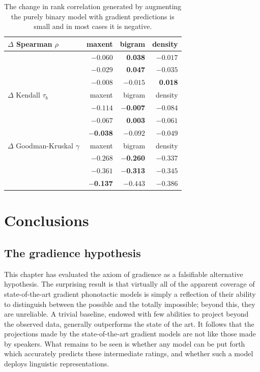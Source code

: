 \begin{table} \centering
\begin{tabular}{l r r r}
\toprule
$\Delta$ Spearman $\rho$          & maxent            & bigram            & density  \\
\midrule
\citealt{Greenberg1964}  & $-0.060$          &  \textbf{0.038} & $-0.017$ \\
\citealt{Scholes1966}    & $-0.029$          &  \textbf{0.047} & $-0.035$ \\
\citealt{Albright2003b}  & $-0.008$          & $-0.015$          & \textbf{0.018} \\
\midrule
$\Delta$ Kendall $\tau_b$         & maxent            & bigram            & density  \\
\midrule
\citealt{Greenberg1964}  & $-0.114$          & \textbf{$-$0.007} & $-0.084$ \\
\citealt{Scholes1966}    & $-0.067$          & \textbf{0.003}  & $-0.061$ \\
\citealt{Albright2003b}  & \textbf{$-$0.038} & $-0.092$          & $-0.049$ \\
\midrule
$\Delta$ Goodman-Kruskal $\gamma$ & maxent            & bigram            & density  \\
\midrule
\citealt{Greenberg1964}  & $-0.268$          & \textbf{$-$0.260} & $-0.337$ \\
\citealt{Scholes1966}    & $-0.361$          & \textbf{$-$0.313} & $-0.345$ \\
\citealt{Albright2003b}  & \textbf{$-$0.137} & $-0.443$          & $-0.386$ \\
\bottomrule
\end{tabular}
\caption{The change in rank correlation generated by augmenting the purely binary model with gradient predictions is small and in most cases it is negative.}
\label{controlled}
\end{table}

\section{Conclusions}

\subsection{The gradience hypothesis}

This chapter has evaluated the axiom of gradience as a falsifiable alternative hypothesis. The surprising result is that virtually all of the apparent coverage of state-of-the-art gradient phonotactic models is simply a reflection of their ability to distinguish between the possible and the totally impossible; beyond this, they are unreliable. A trivial baseline, endowed with few abilities to project beyond the observed data, generally outperforms the state of the art. It follows that the projections made by the state-of-the-art gradient models are not like those made by speakers. What remains to be seen is whether any model can be put forth which accurately predicts these intermediate ratings, and whether such a model deploys linguistic representations. 

